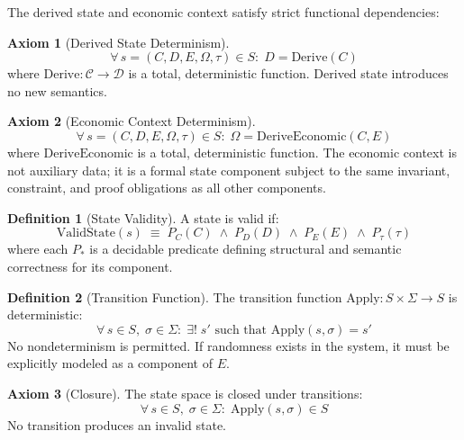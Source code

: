 \documentclass[11pt,a4paper]{article}
\theoremstyle{definition}
\newtheorem{definition}{Definition}[section]
\newtheorem{axiom}{Axiom}[section]
\newcommand{\Apply}{\mathrm{Apply}}
\newcommand{\Derive}{\mathrm{Derive}}
\newcommand{\ValidState}{\mathrm{ValidState}}
\begin{document}
The derived state and economic context satisfy strict functional dependencies:

\begin{axiom}[Derived State Determinism]
\label{ax:derived-state}
\begin{equation}
\forall\, s = (C, D, E, \Omega, \tau) \in S:\; D = \Derive(C)
\end{equation}
where $\Derive: \mathcal{C} \to \mathcal{D}$ is a total, deterministic function. Derived state introduces no new semantics.
\end{axiom}

\begin{axiom}[Economic Context Determinism]
\label{ax:economic-context}
\begin{equation}
\forall\, s = (C, D, E, \Omega, \tau) \in S:\; \Omega = \mathrm{DeriveEconomic}(C, E)
\end{equation}
where $\mathrm{DeriveEconomic}$ is a total, deterministic function. The economic context is not auxiliary data; it is a formal state component subject to the same invariant, constraint, and proof obligations as all other components.
\end{axiom}

\begin{definition}[State Validity]
\label{def:state-validity}
A state is valid if:
\begin{equation}
\ValidState(s) \;\equiv\; P_C(C) \;\land\; P_D(D) \;\land\; P_E(E) \;\land\; P_\tau(\tau)
\end{equation}
where each $P_*$ is a decidable predicate defining structural and semantic correctness for its component.
\end{definition}

\begin{definition}[Transition Function]
\label{def:transition-function}
The transition function $\Apply: S \times \Sigma \to S$ is deterministic:
\begin{equation}
\forall\, s \in S,\; \sigma \in \Sigma:\; \exists!\; s' \text{ such that } \Apply(s, \sigma) = s'
\end{equation}
No nondeterminism is permitted. If randomness exists in the system, it must be explicitly modeled as a component of $E$.
\end{definition}

\begin{axiom}[Closure]
\label{ax:closure}
The state space is closed under transitions:
\begin{equation}
\forall\, s \in S,\; \sigma \in \Sigma:\; \Apply(s, \sigma) \in S
\end{equation}
No transition produces an invalid state.
\end{axiom}
\end{document}
